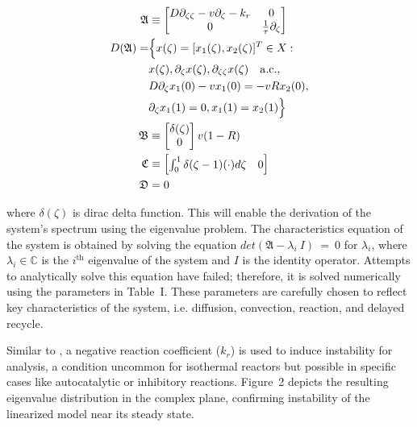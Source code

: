 \begin{equation} \label{eq:2_operator_A}
    \begin{aligned}
        \mathfrak{A} &\equiv
        \begin{bmatrix}
            D \partial_{\zeta \zeta} - v \partial_\zeta - k_r & 0 \\
            0 & \frac{1}{\tau} \partial_\zeta
        \end{bmatrix} \\
        D(\mathfrak{A}) =& \Bigl\{ {x}(\zeta) = [x_1(\zeta), x_2(\zeta)]^T \in X:\\
        &{x}(\zeta), \partial_\zeta {x}(\zeta), \partial_{\zeta \zeta} {x}(\zeta) \quad \mathrm{a.c.},\\
        &D \partial_\zeta x_1(0) - v x_1(0) = -v R x_2(0),\\
        &\partial_\zeta x_1(1) = 0,
        x_1(1) = x_2(1) \Bigr\}\\
        \mathfrak{B} &\equiv
        \begin{bmatrix}
            \delta(\zeta) \\
            0
        \end{bmatrix} v(1-R) \\
        \mathfrak{C} &\equiv
        \begin{bmatrix}
            \int_0^1 \delta(\zeta-1) (\cdot) d\zeta & 0
        \end{bmatrix} \\
        \mathfrak{D} &= 0
    \end{aligned}
\end{equation}

where $\delta(\zeta)$ is dirac delta function. This will enable the derivation of the system's spectrum using the eigenvalue problem. The characteristics equation of the system is obtained by solving the equation $det(\mathfrak{A}-\lambda_i~I)~=~0$ for $\lambda_i$, where $\lambda_i \in \mathbb{C}$ is the $i^{\text{th}}$ eigenvalue of the system and $I$ is the identity operator. Attempts to analytically solve this equation have failed; therefore, it is solved numerically using the parameters in Table~I. These parameters are carefully chosen to reflect key characteristics of the system, i.e. diffusion, convection, reaction, and delayed recycle. 

Similar to \cite{Moadeli2025Optimal}, a negative reaction coefficient ($k_r$) is used to induce instability for analysis, a condition uncommon for isothermal reactors but possible in specific cases like autocatalytic or inhibitory reactions. Figure~2 depicts the resulting eigenvalue distribution in the complex plane, confirming instability of the linearized model near its steady state.


